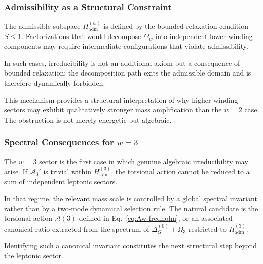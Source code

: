   \subsubsection*{Admissibility as a Structural Constraint}

    The admissible subspace $H_{\mathrm{adm}}^{(w)}$ is defined by the
    bounded-relaxation condition $S\le 1$.
    Factorizations that would decompose $\Omega_w$ into independent
    lower-winding components may require intermediate configurations
    that violate admissibility.

    In such cases, irreducibility is not an additional axiom but a
    consequence of bounded relaxation:
    the decomposition path exits the admissible domain and is therefore
    dynamically forbidden.

    This mechanism provides a structural interpretation of why higher
    winding sectors may exhibit qualitatively stronger mass amplification
    than the $w=2$ case.
    The obstruction is not merely energetic but algebraic.

  \subsubsection*{Spectral Consequences for $w=3$}

    The $w=3$ sector is the first case in which genuine algebraic
    irreducibility may arise.
    If $\mathcal{A}_3'$ is trivial within $H_{\mathrm{adm}}^{(3)}$,
    the torsional action cannot be reduced to a sum of independent
    leptonic sectors.

    In that regime, the relevant mass scale is controlled by a
    global spectral invariant rather than by a two-mode dynamical selection rule.
    The natural candidate is the torsional action
    \(
    \mathcal{A}(3)
    \)
    defined in Eq.~\eqref{eq:Aw-fredholm},
    or an associated canonical ratio extracted from the spectrum of
    \(
    \Delta^{(0)}_G+\Omega_3
    \)
    restricted to $H_{\mathrm{adm}}^{(3)}$.

    Identifying such a canonical invariant constitutes the next
    structural step beyond the leptonic sector.
